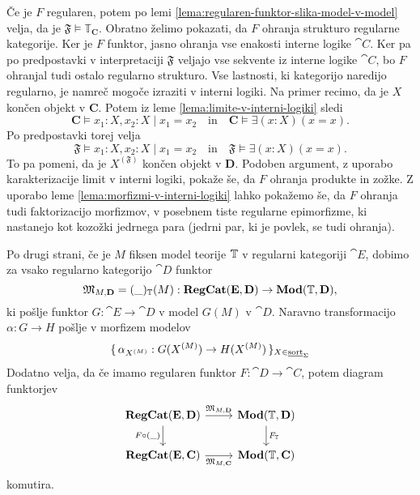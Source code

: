 \documentclass[../kategoricna_logika.tex]{subfiles}
\begin{document}
\begin{dokaz}
  Če je $F$ regularen, potem po lemi
  \ref{lema:regularen-funktor-slika-model-v-model} velja, da je
  $\mathfrak{F} \models \mathbb{T}_{\mathbf{C}}$.  Obratno želimo
  pokazati, da $F$ ohranja strukturo regularne kategorije. Ker je $F$
  funktor, jasno ohranja vse enakosti interne logike $\cat{C}$. Ker pa
  po predpostavki v interpretaciji $\mathfrak{F}$ veljajo vse sekvente
  iz interne logike $\cat{C}$, bo $F$ ohranjal tudi ostalo regularno
  strukturo. Vse lastnosti, ki kategorijo naredijo regularno, je
  namreč mogoče izraziti v interni logiki. Na primer recimo, da je $X$
  končen objekt v $\mathbf{C}$. Potem iz leme
  \ref{lema:limite-v-interni-logiki} sledi
  \[ \mathbf{C} \models x_1:X,x_2:X \mid  x_{1} = x_{2}\quad \text{in} \quad \mathbf{C}
    \models \exists (x:X) (x = x).\]
  Po predpostavki torej velja
  $$\mathfrak{F} \models x_1:X, x_2:X \mid x_{1} = x_{2}\quad
  \text{in}\quad {\mathfrak{F} \models \exists (x:X) (x = x)}.$$
  To pa pomeni, da je
  $X^{(\mathfrak{F})}$ končen objekt v $\mathbf{D}$.  Podoben
  argument, z uporabo karakterizacije limit v interni logiki, pokaže
  še, da $F$ ohranja produkte in zožke.  Z uporabo leme
  \ref{lema:morfizmi-v-interni-logiki} lahko pokažemo še, da $F$
  ohranja tudi faktorizacijo morfizmov, v posebnem tiste regularne
  epimorfizme, ki nastanejo kot kozožki jedrnega para (jedrni par, ki
  je povlek, se tudi ohranja).
\end{dokaz}
Po drugi strani, če je $M$ fiksen model teorije $\mathbb{T}$ v regularni
kategoriji $\cat{E}$, dobimo za vsako regularno kategorijo $\cat{D}$
funktor
\begin{equation}\label{equation:def-funktor-iz-regcat-v-mod}
  \mathfrak{M}_{M,{\operatorname{\mathbf{D}}}} = (\_)_{\mathbb{T}}(M): {\operatorname{\mathbf{RegCat}}}({\operatorname{\mathbf{E}}}, {\operatorname{\mathbf{D}}}) \to \mathbf{Mod}(\mathbb{T}, {\operatorname{\mathbf{D}}}),
\end{equation}
ki pošlje funktor $G : \cat{E} \to \cat{D}$ v model $G(M)$ v
$\cat{D}$.  Naravno transformacijo $\alpha : G \to H$ pošlje v
morfizem modelov
$$\lbrace\,\alpha_{{X}^{(M)}}: G({X}^{(M)}) \to H({X}^{(M)})\,\rbrace_{X \in \underline{\mathrm{sort}}_{\Sigma}}$$
Dodatno velja, da če imamo regularen funktor
$F : \cat{D} \to \cat{C}$, potem diagram funktorjev
\begin{equation}\label{diag:naravnost-M}
  \begin{tikzcd}
    \cat{RegCat}(\cat{E}, \cat{D}) \ar[d, "F \circ (\_)"'] \ar[r, "\mathfrak{M}_{M,\cat{D}}"] & \Mod(\T, \cat{D}) \ar[d, "F_{\T}"] \\
    \cat{RegCat}(\cat{E}, \cat{C}) \ar[r, "\mathfrak{M}_{M,\cat{C}}"']
    & \Mod(\T, \cat{C})
  \end{tikzcd}
\end{equation}
komutira.
\end{document}
